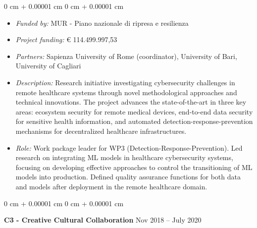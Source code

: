 \documentclass[10pt, a4paper]{article}
\newenvironment{highlights}{
    \begin{itemize}[
        topsep=0.10 cm,
        parsep=0.10 cm,
        partopsep=0pt,
        itemsep=0pt,
        leftmargin=0 cm + 10pt
    ]
}{
    \end{itemize}
} %
\newenvironment{onecolentry}{
    \begin{adjustwidth}{
        0 cm + 0.00001 cm
    }{
        0 cm + 0.00001 cm
    }
}{
    \end{adjustwidth}
} %
\newenvironment{twocolentry}[2][]{
    \onecolentry
    \def\secondColumn{#2}
    \setcolumnwidth{\fill, 4.5 cm}
    \begin{paracol}{2}
}{
    \switchcolumn \raggedleft \secondColumn
    \end{paracol}
    \endonecolentry
} %
\begin{document}
        \vspace{0.10 cm}
        \begin{onecolentry}
            \begin{highlights}
                \item \textit{Funded by:} MUR - Piano nazionale di ripresa e resilienza
                \item \textit{Project funding:} € 114.499.997,53
                \item \textit{Partners:} Sapienza University of Rome (coordinator), University of Bari, University of Cagliari
                \item \textit{Description:} Research initiative investigating cybersecurity challenges in remote healthcare systems through novel methodological approaches and technical innovations. The project advances the state-of-the-art in three key areas: ecosystem security for remote medical devices, end-to-end data security for sensitive health information, and automated detection-response-prevention mechanisms for decentralized healthcare infrastructures.
                \item \textit{Role:} Work package leader for WP3 (Detection-Response-Prevention). Led research on integrating ML models in healthcare cybersecurity systems, focusing on developing effective approaches to control the transitioning of ML models into production. Defined quality assurance functions for both data and models after deployment in the remote healthcare domain.
            \end{highlights}
        \end{onecolentry}


        \vspace{0.2 cm}

        \begin{twocolentry}{
            Nov 2018 – July 2020
        }
            \textbf{C3 - Creative Cultural Collaboration}\end{twocolentry}
\end{document}
